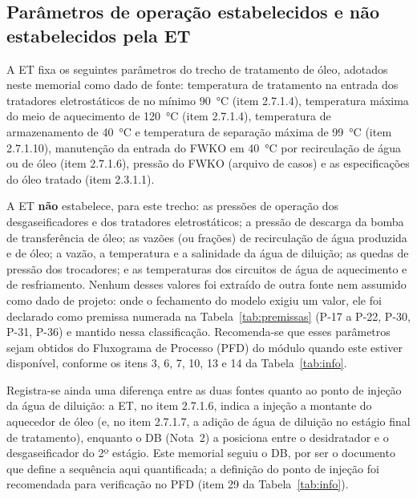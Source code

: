 \documentclass[11pt,a4paper]{article}
\numberwithin{equation}{section}
\numberwithin{table}{section}
\numberwithin{figure}{section}
\begin{document}
\subsection{Parâmetros de operação estabelecidos e não estabelecidos pela ET}\label{sec:etparams}
A ET fixa os seguintes parâmetros do trecho de tratamento de óleo, adotados neste memorial como dado de fonte: temperatura de tratamento na entrada dos tratadores eletrostáticos de no mínimo 90~\si{\celsius} (item 2.7.1.4), temperatura máxima do meio de aquecimento de 120~\si{\celsius} (item 2.7.1.4), temperatura de armazenamento de 40~\si{\celsius} e temperatura de separação máxima de 99~\si{\celsius} (item 2.7.1.10), manutenção da entrada do FWKO em 40~\si{\celsius} por recirculação de água ou de óleo (item 2.7.1.6), pressão do FWKO (arquivo de casos) e as especificações do óleo tratado (item 2.3.1.1).

A ET \textbf{não} estabelece, para este trecho: as pressões de operação dos desgaseificadores e dos tratadores eletrostáticos; a pressão de descarga da bomba de transferência de óleo; as vazões (ou frações) de recirculação de água produzida e de óleo; a vazão, a temperatura e a salinidade da água de diluição; as quedas de pressão dos trocadores; e as temperaturas dos circuitos de água de aquecimento e de resfriamento. Nenhum desses valores foi extraído de outra fonte nem assumido como dado de projeto: onde o fechamento do modelo exigiu um valor, ele foi declarado como premissa numerada na Tabela~\ref{tab:premissas} (P-17 a P-22, P-30, P-31, P-36) e mantido nessa classificação. Recomenda-se que esses parâmetros sejam obtidos do Fluxograma de Processo (PFD) do módulo quando este estiver disponível, conforme os itens 3, 6, 7, 10, 13 e 14 da Tabela~\ref{tab:info}.

Registra-se ainda uma diferença entre as duas fontes quanto ao ponto de injeção da água de diluição: a ET, no item 2.7.1.6, indica a injeção a montante do aquecedor de óleo (e, no item 2.7.1.7, a adição de água de diluição no estágio final de tratamento), enquanto o DB (Nota~2) a posiciona entre o desidratador e o desgaseificador do 2º estágio. Este memorial seguiu o DB, por ser o documento que define a sequência aqui quantificada; a definição do ponto de injeção foi recomendada para verificação no PFD (item 29 da Tabela~\ref{tab:info}).
\end{document}
